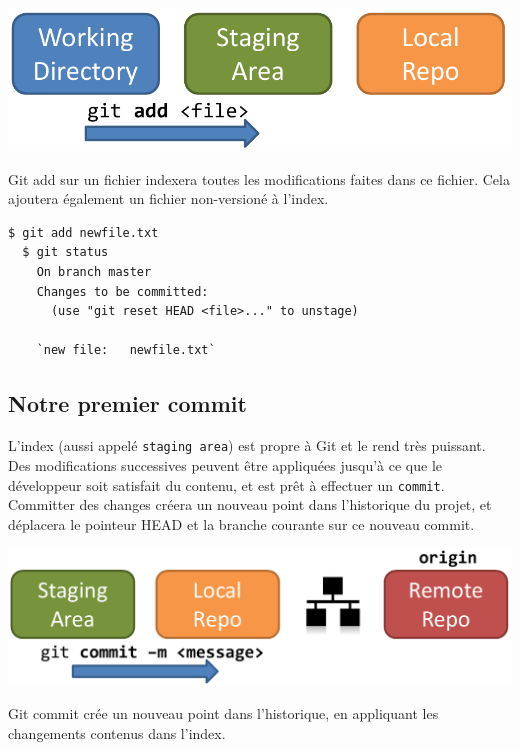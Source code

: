 \documentclass{../../common/tufte-latex/tufte-handout}
\begin{document}
\begin{marginfigure}%
  \centering
  \includegraphics[width=\linewidth]{gitadd-schema.pdf}
  \label{fig:gitadd}
  \caption{Git add sur un fichier indexera toutes les modifications faites dans ce fichier. Cela ajoutera également un fichier non-versioné à l'index.}
\end{marginfigure}

\begin{lstlisting}[style=BashInputStyle]
  $ git add newfile.txt
  $ git status
    On branch master
    Changes to be committed:
      (use "git reset HEAD <file>..." to unstage)
  
    `new file:   newfile.txt`
\end{lstlisting}

\subsection{Notre premier commit}

L'index (aussi appelé \texttt{staging area}) est propre à Git et le rend très puissant.
Des modifications successives peuvent être appliquées jusqu'à ce que le développeur soit satisfait du contenu, et est prêt à effectuer un \texttt{commit}.
Committer des changes créera un nouveau point dans l'historique du projet, et déplacera le pointeur HEAD et la branche courante sur ce nouveau commit.

\begin{marginfigure}%
  \centering
  \includegraphics[width=\linewidth]{gitcommit-schema.pdf}
  \label{fig:gitcommit}
  \caption{Git commit crée un nouveau point dans l'historique, en appliquant les changements contenus dans l'index.}
\end{marginfigure}
\end{document}
